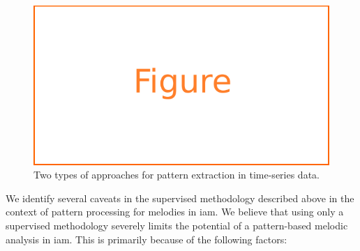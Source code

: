 \begin{figure}
	\begin{center}
		\includegraphics[width=\figSizeSixty]{ch06_patterns/figures/figure_todo.pdf}
	\end{center}
	\caption{Two types of approaches for pattern extraction in time-series data.}
	\label{fig:types_of_methodologies_for_extraction}
\end{figure}

We identify several caveats in the supervised methodology described above in the context of pattern processing for melodies in \gls{iam}. We believe that using only a supervised methodology severely limits the potential of a pattern-based melodic analysis in \gls{iam}. This is primarily because of the following factors:


